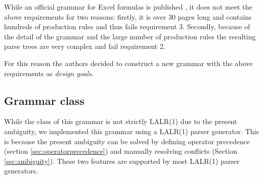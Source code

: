 \documentclass[conference]{IEEEtran}
\begin{document}
While an official grammar for Excel formulas is published \cite{ExcelOfficialGrammar}, it does not meet the above requirements for two reasons: firstly, it is over 30 pages long and contains hundreds of production rules and thus fails requirement 3.
Secondly, because of the detail of the grammar and the large number of production rules the resulting parse trees are very complex and fail requirement 2.

For this reason the authors decided to construct a new grammar with the above requirements as \emph{design goals}.

\subsection{Grammar class}

While the class of this grammar is not strictly LALR(1) due to the present ambiguity, we implemented this grammar using a LALR(1) parser generator.
This is because the present ambiguity can be solved by defining operator precedence (section \ref{sec:operatorprecedence}) and manually resolving conflicts (Section \ref{sec:ambiguity}).
These two features are supported by most LALR(1) parser generators.
\end{document}

